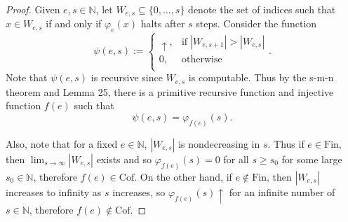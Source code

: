 \documentclass{article}
\begin{document}
\begin{enumerate}[label={\bf Q\arabic*:}]
    \begin{proof}
      Given $e,s\in\mathbb{N}$, let $W_{e,s}\subseteq\{0,\ldots,s\}$ denote
      the set of indices such that $x\in W_{e,s}$ if and only if
      $\varphi_e(x)$ halts after $s$ steps. Consider the function
      \begin{equation*}
        \psi(e,s) :=
        \begin{cases}
          \uparrow, &\text{if}\; |W_{e,s+1}|>|W_{e,s}|\\
          0, &\text{otherwise}\\
        \end{cases}.
      \end{equation*}
      Note that $\psi(e,s)$ is recursive since $W_{e,s}$ is computable.
      Thus by the s-m-n theorem and Lemma 25, there is a primitive
      recursive function and injective function $f(e)$ such that
      \[\psi(e,s)=\varphi_{f(e)}(s).\]

      Also, note that for a fixed $e\in\mathbb{N}$, $|W_{e,s}|$ is
      nondecreasing in $s$. Thus if $e\in\text{Fin}$, then
      $\lim_{s\rightarrow\infty}|W_{e,s}|$ exists and so
      $\varphi_{f(e)}(s)=0$ for all $s\geq s_0$ for some large
      $s_0\in\mathbb{N}$, therefore $f(e)\in\text{Cof}$. On the
      other hand, if $e\not\in\text{Fin}$, then
      $|W_{e,s}|$ increases to infinity as $s$ increases, so
      $\varphi_{f(e)}(s)\uparrow$ for an infinite number of
      $s\in\mathbb{N}$, therefore $f(e)\not\in\text{Cof}$.
    \end{proof}
\end{enumerate}
\end{document}
